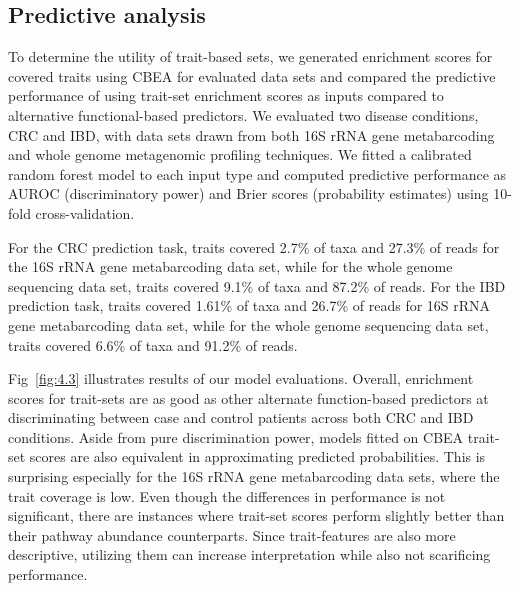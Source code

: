 \subsection*{Predictive analysis} 
To determine the utility of trait-based sets, we generated enrichment scores for covered traits using CBEA \cite{nguyen2021cbea} for evaluated data sets and compared the predictive performance of using trait-set enrichment scores as inputs compared to alternative functional-based predictors. We evaluated two disease conditions, CRC and IBD, with data sets drawn from both 16S rRNA gene metabarcoding and whole genome metagenomic profiling techniques. We fitted a calibrated random forest model to each input type and computed predictive performance as AUROC (discriminatory power) and Brier scores (probability estimates) using 10-fold cross-validation.  

For the CRC prediction task, traits covered 2.7\% of taxa and 27.3\% of reads for the 16S rRNA gene metabarcoding data set, while for the whole genome sequencing data set, traits covered 9.1\% of taxa and 87.2\% of reads. For the IBD prediction task, traits covered 1.61\% of taxa and 26.7\% of reads for 16S rRNA gene metabarcoding data set, while for the whole genome sequencing data set, traits covered 6.6\% of taxa and 91.2\% of reads.  

Fig~\ref{fig:4.3} illustrates results of our model evaluations. Overall, enrichment scores for trait-sets are as good as other alternate function-based predictors at discriminating between case and control patients across both CRC and IBD conditions. Aside from pure discrimination power, models fitted on CBEA trait-set scores are also equivalent in approximating predicted probabilities. This is surprising especially for the 16S rRNA gene metabarcoding data sets, where the trait coverage is low. Even though the differences in performance is not significant, there are instances where trait-set scores perform slightly better than their pathway abundance counterparts. Since trait-features are also more descriptive, utilizing them can increase interpretation while also not scarificing performance.   

